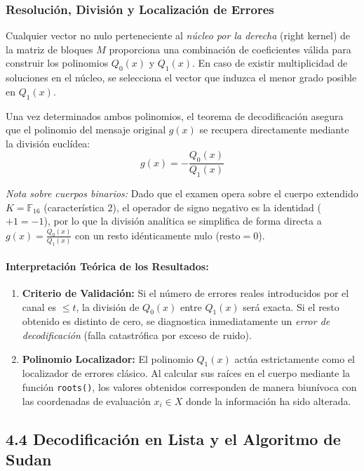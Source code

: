 \documentclass{article}
\begin{document}
\subsubsection{Resolución, División y Localización de Errores}

Cualquier vector no nulo perteneciente al \textit{núcleo por la derecha} (right kernel) de la matriz de bloques $M$ proporciona una combinación de coeficientes válida para construir los polinomios $Q_0(x)$ y $Q_1(x)$. En caso de existir multiplicidad de soluciones en el núcleo, se selecciona el vector que induzca el menor grado posible en $Q_1(x)$.

Una vez determinados ambos polinomios, el teorema de decodificación asegura que el polinomio del mensaje original $g(x)$ se recupera directamente mediante la división euclídea:
\[
g(x) = -\frac{Q_0(x)}{Q_1(x)}
\]

\textit{Nota sobre cuerpos binarios:} Dado que el examen opera sobre el cuerpo extendido $K = \mathbb{F}_{16}$ (característica 2), el operador de signo negativo es la identidad ($+1 = -1$), por lo que la división analítica se simplifica de forma directa a $g(x) = \frac{Q_0(x)}{Q_1(x)}$ con un resto idénticamente nulo ($\text{resto} = 0$).

\paragraph{Interpretación Teórica de los Resultados:}
\begin{enumerate}
    \item \textbf{Criterio de Validación:} Si el número de errores reales introducidos por el canal es $\le t$, la división de $Q_0(x)$ entre $Q_1(x)$ será exacta. Si el resto obtenido es distinto de cero, se diagnostica inmediatamente un \textit{error de decodificación} (falla catastrófica por exceso de ruido).
    \item \textbf{Polinomio Localizador:} El polinomio $Q_1(x)$ actúa estrictamente como el localizador de errores clásico. Al calcular sus raíces en el cuerpo mediante la función \texttt{roots()}, los valores obtenidos corresponden de manera biunívoca con las coordenadas de evaluación $x_i \in X$ donde la información ha sido alterada.
\end{enumerate}


\subsection{4.4 Decodificación en Lista y el Algoritmo de Sudan}
\end{document}
